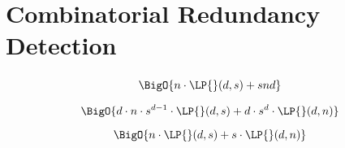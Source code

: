 \section{Combinatorial Redundancy Detection}
\begin{frame}\frametitle{\insertsection}\justifying
{}
\vspace{.3cm}
\begin{displaymath}
\BigO{n\cdot\LP{}(d,s) + snd}
\end{displaymath}
\vspace{.3cm}\pause

\vspace{.3cm}
\begin{displaymath}
\BigO{d\cdot n\cdot s^{d-1}\cdot\LP{}(d,s) + d\cdot s^d\cdot \LP{}(d,n)}
\end{displaymath}
\vspace{.3cm}\pause

\vspace{.3cm}
\begin{displaymath}
\BigO{n\cdot\LP{}(d,s) + s\cdot\LP{}(d,n)}
\end{displaymath}
\end{frame}
